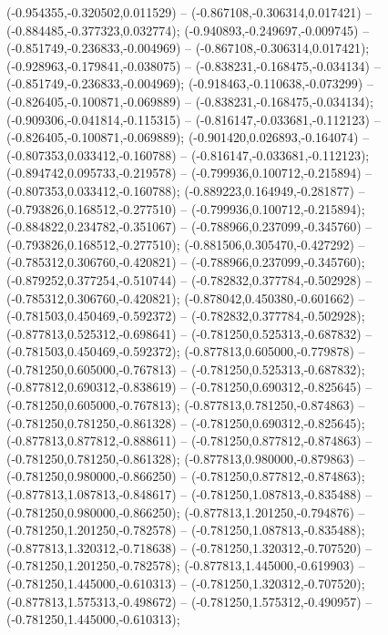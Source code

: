  (-0.954355,-0.320502,0.011529) -- (-0.867108,-0.306314,0.017421) -- (-0.884485,-0.377323,0.032774);
 (-0.940893,-0.249697,-0.009745) -- (-0.851749,-0.236833,-0.004969) -- (-0.867108,-0.306314,0.017421);
 (-0.928963,-0.179841,-0.038075) -- (-0.838231,-0.168475,-0.034134) -- (-0.851749,-0.236833,-0.004969);
 (-0.918463,-0.110638,-0.073299) -- (-0.826405,-0.100871,-0.069889) -- (-0.838231,-0.168475,-0.034134);
 (-0.909306,-0.041814,-0.115315) -- (-0.816147,-0.033681,-0.112123) -- (-0.826405,-0.100871,-0.069889);
 (-0.901420,0.026893,-0.164074) -- (-0.807353,0.033412,-0.160788) -- (-0.816147,-0.033681,-0.112123);
 (-0.894742,0.095733,-0.219578) -- (-0.799936,0.100712,-0.215894) -- (-0.807353,0.033412,-0.160788);
 (-0.889223,0.164949,-0.281877) -- (-0.793826,0.168512,-0.277510) -- (-0.799936,0.100712,-0.215894);
 (-0.884822,0.234782,-0.351067) -- (-0.788966,0.237099,-0.345760) -- (-0.793826,0.168512,-0.277510);
 (-0.881506,0.305470,-0.427292) -- (-0.785312,0.306760,-0.420821) -- (-0.788966,0.237099,-0.345760);
 (-0.879252,0.377254,-0.510744) -- (-0.782832,0.377784,-0.502928) -- (-0.785312,0.306760,-0.420821);
 (-0.878042,0.450380,-0.601662) -- (-0.781503,0.450469,-0.592372) -- (-0.782832,0.377784,-0.502928);
 (-0.877813,0.525312,-0.698641) -- (-0.781250,0.525313,-0.687832) -- (-0.781503,0.450469,-0.592372);
 (-0.877813,0.605000,-0.779878) -- (-0.781250,0.605000,-0.767813) -- (-0.781250,0.525313,-0.687832);
 (-0.877812,0.690312,-0.838619) -- (-0.781250,0.690312,-0.825645) -- (-0.781250,0.605000,-0.767813);
 (-0.877813,0.781250,-0.874863) -- (-0.781250,0.781250,-0.861328) -- (-0.781250,0.690312,-0.825645);
 (-0.877813,0.877812,-0.888611) -- (-0.781250,0.877812,-0.874863) -- (-0.781250,0.781250,-0.861328);
 (-0.877813,0.980000,-0.879863) -- (-0.781250,0.980000,-0.866250) -- (-0.781250,0.877812,-0.874863);
 (-0.877813,1.087813,-0.848617) -- (-0.781250,1.087813,-0.835488) -- (-0.781250,0.980000,-0.866250);
 (-0.877813,1.201250,-0.794876) -- (-0.781250,1.201250,-0.782578) -- (-0.781250,1.087813,-0.835488);
 (-0.877813,1.320312,-0.718638) -- (-0.781250,1.320312,-0.707520) -- (-0.781250,1.201250,-0.782578);
 (-0.877813,1.445000,-0.619903) -- (-0.781250,1.445000,-0.610313) -- (-0.781250,1.320312,-0.707520);
 (-0.877813,1.575313,-0.498672) -- (-0.781250,1.575312,-0.490957) -- (-0.781250,1.445000,-0.610313);
